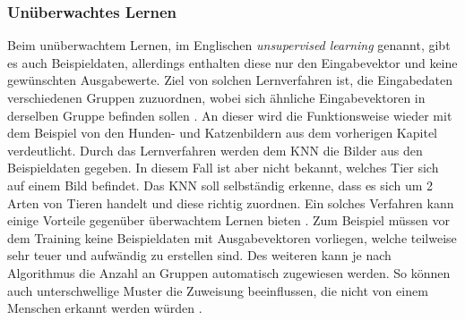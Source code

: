 \subsubsection{Unüberwachtes Lernen}
\label{subsubsec:unsupervised_learning}
Beim unüberwachtem Lernen, im Englischen \emph{unsupervised learning} genannt, gibt es auch Beispieldaten, allerdings enthalten diese nur den Eingabevektor und keine gewünschten Ausgabewerte. Ziel von solchen Lernverfahren ist, die Eingabedaten verschiedenen Gruppen zuzuordnen, wobei sich ähnliche Eingabevektoren in derselben Gruppe befinden sollen \cite{zell2003simulation}. An dieser wird die Funktionsweise wieder mit dem Beispiel von den Hunden- und Katzenbildern aus dem vorherigen Kapitel verdeutlicht. Durch das Lernverfahren werden dem \ac{KNN} die Bilder aus den Beispieldaten gegeben. In diesem Fall ist aber nicht bekannt, welches Tier sich auf einem Bild befindet. Das \ac{KNN} soll selbständig erkenne, dass es sich um 2 Arten von Tieren handelt und diese richtig zuordnen. Ein solches Verfahren kann einige Vorteile gegenüber überwachtem Lernen bieten \cite{mahmad2005IEEE}. Zum Beispiel müssen vor dem Training keine Beispieldaten mit Ausgabevektoren vorliegen, welche teilweise sehr teuer und aufwändig zu erstellen sind. Des weiteren kann je nach Algorithmus die Anzahl an Gruppen automatisch zugewiesen werden. So können auch unterschwellige Muster die Zuweisung beeinflussen, die nicht von einem Menschen erkannt werden würden \cite{mahmad2005IEEE}.
 

